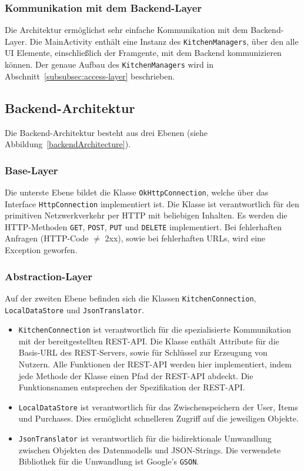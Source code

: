 \subsubsection{Kommunikation mit dem Backend-Layer}

Die Architektur ermöglichst sehr einfache Kommunikation mit dem Backend-Layer.
Die MainActivity enthält eine Instanz des \texttt{KitchenManagers}, über den alle UI Elemente, einschließlich der Framgente, mit dem Backend kommunizieren können.
Der genaue Aufbau des \texttt{KitchenManagers} wird in Abschnitt~\ref{subsubsec:access-layer} beschrieben.

\subsection{Backend-Architektur}\label{subsec:backend}

Die Backend-Architektur besteht aus drei Ebenen (siehe Abbildung~\ref{backendArchitecture}).

\subsubsection{Base-Layer}

Die unterste Ebene bildet die Klasse \texttt{OkHttpConnection}, welche über das Interface \texttt{HttpConnection} implementiert ist.
Die Klasse ist verantwortlich für den primitiven Netzwerkverkehr per HTTP mit beliebigen Inhalten.
Es werden die HTTP-Methoden \texttt{GET}, \texttt{POST}, \texttt{PUT} und \texttt{DELETE} implementiert.
Bei fehlerhaften Anfragen (HTTP-Code $\neq$ 2xx), sowie bei fehlerhaften URLs, wird eine Exception geworfen.

\subsubsection{Abstraction-Layer}

Auf der zweiten Ebene befinden sich die Klassen \texttt{KitchenConnection}, \texttt{LocalDataStore} und \texttt{JsonTranslator}.

\begin{itemize}
	\item  \texttt{KitchenConnection} ist verantwortlich für die spezialisierte Kommunikation mit der bereitgestellten REST-API. Die Klasse enthält Attribute für die Basis-URL des REST-Servers, sowie für Schlüssel zur Erzeugung von Nutzern.
	Alle Funktionen der REST-API werden hier implementiert, indem jede Methode der Klasse einen Pfad der REST-API abdeckt.
	Die Funktionsnamen entsprechen der Spezifikation der REST-API\@.

	\item \texttt{LocalDataStore} ist verantwortlich für das Zwischenspeichern der User, Items und Purchases.
	Dies ermöglicht schnelleren Zugriff auf die jeweiligen Objekte.

	\item \texttt{JsonTranslator} ist verantwortlich für die bidirektionale Umwandlung zwischen Objekten des Datenmodells und JSON-Strings.
	Die verwendete Bibliothek für die Umwandlung ist Google's \texttt{GSON}.
\end{itemize}

